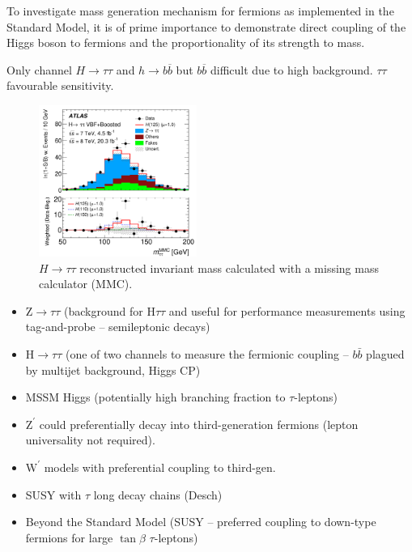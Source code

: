 To investigate mass generation mechanism for fermions as implemented in the
Standard Model, it is of prime importance to demonstrate direct coupling of the
Higgs boson to fermions and the proportionality of its strength to mass.

Only channel $H \to \tau \tau$ and $h \to b \overline{b}$ but $b \overline{b}$
difficult due to high background. $\tau\tau$ favourable sensitivity.

\begin{figure}[htb]
  \centering
  \includegraphics[width=0.46\textwidth]{./figures/theory/htautau_mass.pdf}
  \caption{$H \to \tau \tau$ reconstructed invariant mass calculated with a
    missing mass calculator (MMC).}
  \label{fig:higgstautau_mass}
\end{figure}

\begin{itemize}
  \item $\mathrm{Z} \rightarrow \tau \tau$ (background for H$\tau \tau$ and
    useful for performance measurements using tag-and-probe -- semileptonic
    decays)

  \item $\mathrm{H} \rightarrow \tau \tau$ (one of two channels to measure
    the fermionic coupling -- $b \bar{b}$ plagued by multijet background,
    Higgs CP)

  \item MSSM Higgs (potentially high branching fraction to $\tau$-leptons)

  \item $\mathrm{Z}^\prime$ could preferentially decay into third-generation
    fermions (lepton universality not required).

  \item $\mathrm{W}^\prime$ models with preferential coupling to third-gen.

  \item SUSY with $\tau$ \textrightarrow long decay chains (Desch)

  \item Beyond the Standard Model (SUSY -- preferred coupling to down-type
    fermions for large $\tan\beta$ \textrightarrow $\tau$-leptons)
\end{itemize}

